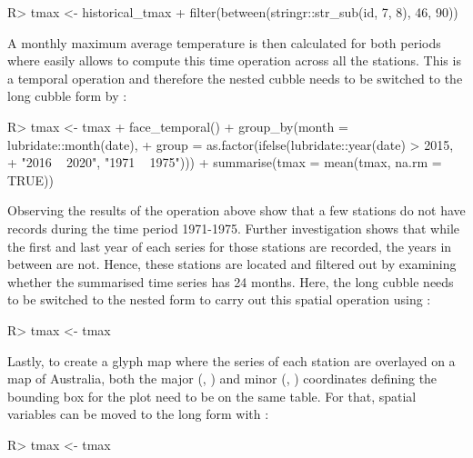 \documentclass[
]{jss}
\begin{document}
\begin{CodeChunk}
\begin{CodeInput}
R> tmax <- historical_tmax %
+   filter(between(stringr::str_sub(id, 7, 8), 46, 90))
\end{CodeInput}
\end{CodeChunk}

A monthly maximum average temperature is then calculated for both periods where  easily allows to compute this time operation across all the stations. This is a temporal operation and therefore the nested cubble needs to be switched to the long cubble form by :

\begin{CodeChunk}
\begin{CodeInput}
R> tmax <- tmax %
+   face_temporal() %
+   group_by(month = lubridate::month(date),
+          group = as.factor(ifelse(lubridate::year(date) > 2015,
+                                   "2016 ~ 2020", "1971 ~ 1975"))) %
+   summarise(tmax = mean(tmax, na.rm = TRUE))
\end{CodeInput}
\end{CodeChunk}

Observing the results of the operation above show that a few stations do not have records during the time period 1971-1975. Further investigation shows that while the first and last year of each series for those stations are recorded, the years in between are not. Hence, these stations are located and filtered out by examining whether the summarised time series has 24 months. Here, the long cubble needs to be switched to the nested form to carry out this spatial operation using :

\begin{CodeChunk}
\begin{CodeInput}
R> tmax <- tmax %
\end{CodeInput}
\end{CodeChunk}

Lastly, to create a glyph map where the series of each station are overlayed on a map of Australia, both the major (, ) and minor (, ) coordinates defining the bounding box for the plot need to be on the same table. For that, spatial variables can be moved to the long form with :

\begin{CodeChunk}
\begin{CodeInput}
R> tmax <- tmax %
\end{CodeInput}
\end{CodeChunk}
\end{document}
